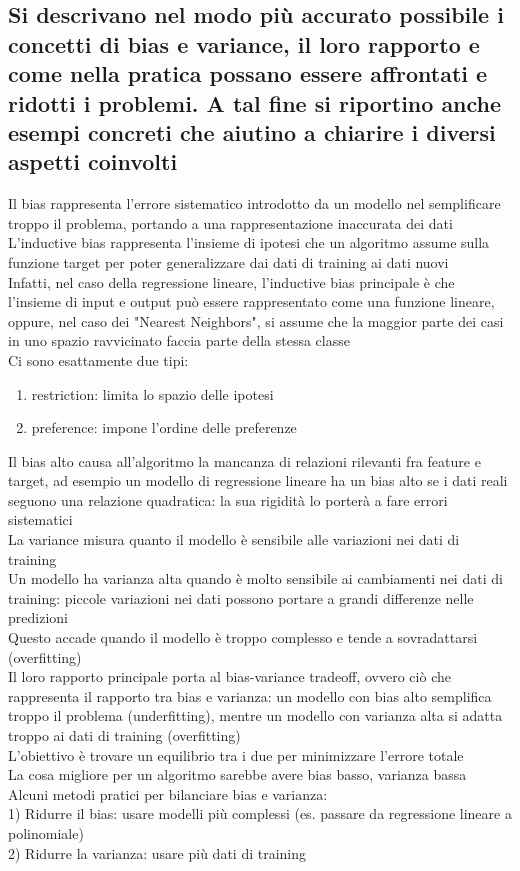 \documentclass[10pt,oneside,a4paper]{article}
\begin{document}
	\subsection{Si descrivano nel modo più accurato possibile i concetti di bias e variance, il loro rapporto e come nella pratica possano essere affrontati e ridotti i problemi. A tal fine si riportino anche esempi concreti che aiutino a chiarire i diversi aspetti coinvolti}
	Il bias rappresenta l'errore sistematico introdotto da un modello nel semplificare troppo il problema, portando a una rappresentazione inaccurata dei dati\\
	L'inductive bias rappresenta l'insieme di ipotesi che un algoritmo assume sulla funzione target per poter generalizzare dai dati di training ai dati nuovi\\
	Infatti, nel caso della regressione lineare, l'inductive bias principale è che l'insieme di input e output può essere rappresentato come una funzione lineare, oppure, nel caso dei "Nearest Neighbors", si assume che la maggior parte dei casi in uno spazio ravvicinato faccia parte della stessa classe \\
	Ci sono esattamente due tipi:
	\begin{enumerate}
		\item restriction: limita lo spazio delle ipotesi
		\item preference: impone l'ordine delle preferenze
	\end{enumerate}
	Il bias alto causa all'algoritmo la mancanza di relazioni rilevanti fra feature e target, ad esempio un modello di regressione lineare ha un bias alto se i dati reali seguono una relazione quadratica: la sua rigidità lo porterà a fare errori sistematici\\
	La variance misura quanto il modello è sensibile alle variazioni nei dati di training\\
	Un modello ha varianza alta quando è molto sensibile ai cambiamenti nei dati di training: piccole variazioni nei dati possono portare a grandi differenze nelle predizioni\\
	Questo accade quando il modello è troppo complesso e tende a sovradattarsi (overfitting)\\
	Il loro rapporto principale porta al bias-variance tradeoff, ovvero ciò che rappresenta il rapporto tra bias e varianza: un modello con bias alto semplifica troppo il problema (underfitting), mentre un modello con varianza alta si adatta troppo ai dati di training (overfitting)\\
	L'obiettivo è trovare un equilibrio tra i due per minimizzare l'errore totale\\
	La cosa migliore per un algoritmo sarebbe avere bias basso, varianza bassa\\
	Alcuni metodi pratici per bilanciare bias e varianza:\\
	1) Ridurre il bias: usare modelli più complessi (es. passare da regressione lineare a polinomiale)\\
	2) Ridurre la varianza: usare più dati di training\\
	
\end{document}
